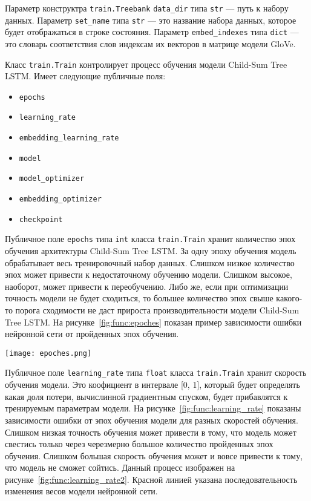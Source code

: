 Параметр конструктра \texttt{train.Treebank} \texttt{data\_dir} типа \texttt{str} --- путь к набору данных. Параметр \texttt{set\_name} типа \texttt{str} --- это название набора данных, которое будет отображаться в строке состояния. Параметр \texttt{embed\_indexes} типа \texttt{dict} --- это словарь соответствия слов индексам их векторов в матрице модели GloVe.

Класс \texttt{train.Train} контролирует процесс обучения модели Child-Sum Tree LSTM\@. Имеет следующие публичные поля:
\begin{itemize}
\item \texttt{epochs}
\item \texttt{learning\_rate}
\item \texttt{embedding\_learning\_rate}
\item \texttt{model}
\item \texttt{model\_optimizer}
\item \texttt{embedding\_optimizer}
\item \texttt{checkpoint}
\end{itemize}

Публичное поле \texttt{epochs} типа \texttt{int} класса \texttt{train.Train} хранит количество эпох обучения архитектуры Child-Sum Tree LSTM\@. За одну эпоху обучения модель обрабатывает весь тренировочный набор данных. Слишком низкое количество эпох может привести к недостаточному обучению модели. Слишком высокое, наоборот, может привести к переобучению. Либо же, если при оптимизации точность модели не будет сходиться, то большее количество эпох свыше какого-то порога сходимости не даст прироста производительности модели Child-Sum Tree LSTM\@. На рисунке~\ref{fig:func:epoches} показан пример зависимости ошибки нейронной сети от пройденных эпох обучения.

\begin{center}
  \texttt{[image: epoches.png]}
  \label{fig:func:epoches}
\end{center}

Публичное поле \texttt{learning\_rate} типа \texttt{float} класса \texttt{train.Train} хранит скорость обучения модели. Это коофициент в интервале [0, 1], который будет определять какая доля потери, вычислинной градиентным спуском, будет прибавлятся к тренируемым параметрам модели. На рисунке~\ref{fig:func:learning_rate} показаны зависимости ошибки от эпох обучения модели для разных скоростей обучения. Слишком низкая точность обучения может привести в тому, что модель может свестись только через черезмерно большое количество пройденных эпох обучения. Слишком большая скорость обучения может и вовсе привести к тому, что модель не сможет сойтись. Данный процесс изображен на рисунке~\ref{fig:func:learning_rate2}. Красной линией указана последовательность изменения весов модели нейронной сети.

